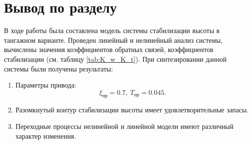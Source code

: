 \section{Вывод по разделу} 
В ходе работы была составлена модель системы стабилизации высоты в тангажном
варианте. Проведен линейный и нелинейный анализ системы, вычислены значения
коэффициентов обратных связей,
коэффициентов стабилизации (см. таблицу \ref{tab:K_w_K_t}). При синтезировании
данной системы были получены результаты:

\begin{enumerate}
    \item Параметры привода:
        \[
            \xi_{пр} = 0.7, \ T_{пр} = 0.045.
        \]
    \item Разомкнутый контур стабилизации высоты имеет удовлетворительные запасы.
    \item Переходные процессы нелинейной и линейной модели имеют различный характер изменения. 
\end{enumerate}

